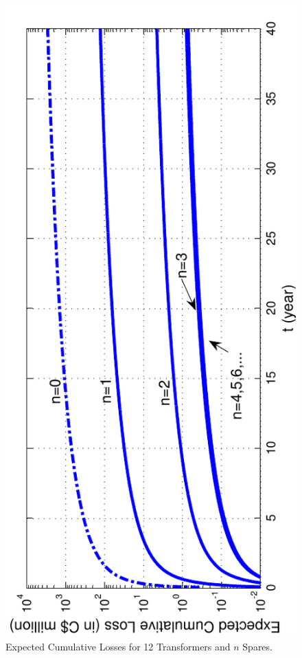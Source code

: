\documentclass[letterpaper, 12pt]{article}
\begin{document}
\begin{figure}[h!] \centering
  \includegraphics[scale=0.8, angle=-90]{CumulativeRewards}
  \caption{Expected Cumulative Losses for 12 Transformers and $n$ Spares.\label{fig:CumulativeRewards}} 
\end{figure}
\end{document}

